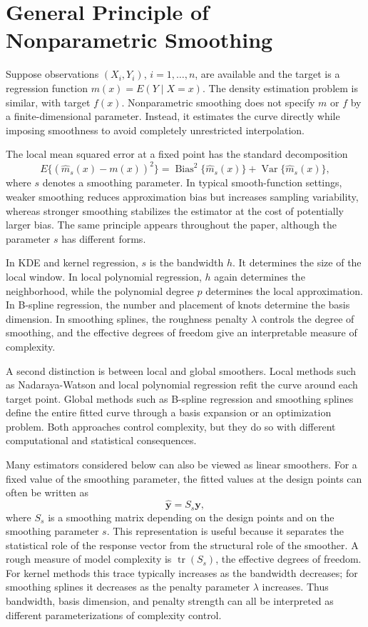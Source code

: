 \documentclass[12pt,a4paper]{article}
\begin{document}
\section{General Principle of Nonparametric Smoothing}
\label{sec:principle}

Suppose observations \((X_i,Y_i)\), \(i=1,\ldots,n\), are available and the target is a regression function \(m(x)=E(Y\mid X=x)\). The density estimation problem is similar, with target \(f(x)\). Nonparametric smoothing does not specify \(m\) or \(f\) by a finite-dimensional parameter. Instead, it estimates the curve directly while imposing smoothness to avoid completely unrestricted interpolation.

The local mean squared error at a fixed point has the standard decomposition
\[
E\{(\hat m_s(x)-m(x))^2\}
=\operatorname{Bias}^2\{\hat m_s(x)\}
+\operatorname{Var}\{\hat m_s(x)\},
\]
where \(s\) denotes a smoothing parameter. In typical smooth-function settings, weaker smoothing reduces approximation bias but increases sampling variability, whereas stronger smoothing stabilizes the estimator at the cost of potentially larger bias. The same principle appears throughout the paper, although the parameter \(s\) has different forms.

In KDE and kernel regression, \(s\) is the bandwidth \(h\). It determines the size of the local window. In local polynomial regression, \(h\) again determines the neighborhood, while the polynomial degree \(p\) determines the local approximation. In B-spline regression, the number and placement of knots determine the basis dimension. In smoothing splines, the roughness penalty \(\lambda\) controls the degree of smoothing, and the effective degrees of freedom give an interpretable measure of complexity.

A second distinction is between local and global smoothers. Local methods such as Nadaraya-Watson and local polynomial regression refit the curve around each target point. Global methods such as B-spline regression and smoothing splines define the entire fitted curve through a basis expansion or an optimization problem. Both approaches control complexity, but they do so with different computational and statistical consequences.

Many estimators considered below can also be viewed as linear smoothers. For a fixed value of the smoothing parameter, the fitted values at the design points can often be written as
\[
\hat{\mathbf y}=S_s\mathbf y,
\]
where \(S_s\) is a smoothing matrix depending on the design points and on the smoothing parameter \(s\). This representation is useful because it separates the statistical role of the response vector from the structural role of the smoother. A rough measure of model complexity is \(\operatorname{tr}(S_s)\), the effective degrees of freedom. For kernel methods this trace typically increases as the bandwidth decreases; for smoothing splines it decreases as the penalty parameter \(\lambda\) increases. Thus bandwidth, basis dimension, and penalty strength can all be interpreted as different parameterizations of complexity control.
\end{document}
